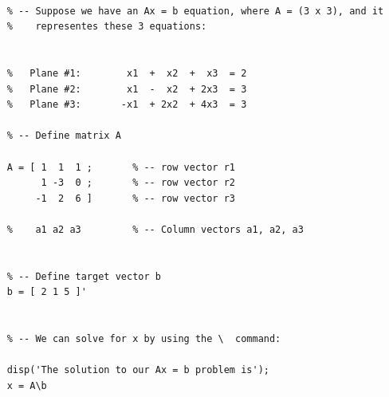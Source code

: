 \documentclass{article}
\begin{document}
\begin{verbatim}
    
    % -- Suppose we have an Ax = b equation, where A = (3 x 3), and it
    %    representes these 3 equations:
    
    
    %   Plane #1:        x1  +  x2  +  x3  = 2
    %   Plane #2:        x1  -  x2  + 2x3  = 3
    %   Plane #3:       -x1  + 2x2  + 4x3  = 3
    
    % -- Define matrix A
    
    A = [ 1  1  1 ;       % -- row vector r1
          1 -3  0 ;       % -- row vector r2
         -1  2  6 ]       % -- row vector r3
    
    %    a1 a2 a3         % -- Column vectors a1, a2, a3
    
    
    % -- Define target vector b
    b = [ 2 1 5 ]'
    
    
    % -- We can solve for x by using the \  command:
    
    disp('The solution to our Ax = b problem is');
    x = A\b
    

\end{verbatim}
\end{document}

